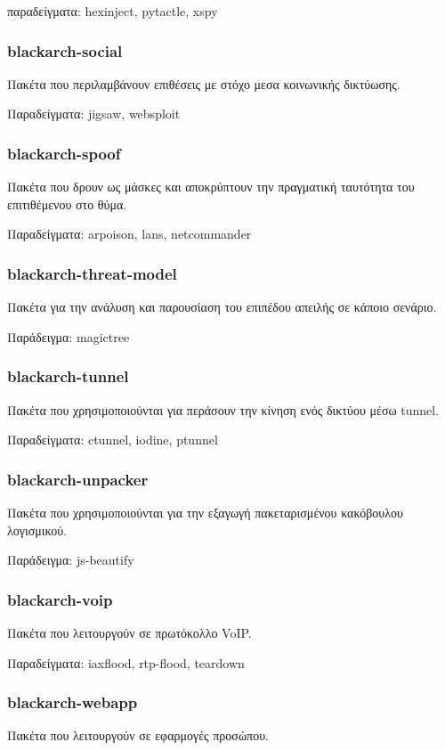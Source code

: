 \documentclass[a4paper, oneside, 11pt]{book}
\begin{document}
παραδείγματα: hexinject, pytactle, xspy

\subsubsection{blackarch-social}
Πακέτα που περιλαμβάνουν επιθέσεις με στόχο
μεσα κοινωνικής δικτύωσης.

Παραδείγματα: jigsaw, websploit

\subsubsection{blackarch-spoof}
Πακέτα που δρουν ως μάσκες και αποκρύπτουν την
πραγματική ταυτότητα του επιτιθέμενου στο θύμα.

Παραδείγματα: arpoison, lans, netcommander

\subsubsection{blackarch-threat-model}
Πακέτα για την ανάλυση και παρουσίαση του επιπέδου
απειλής σε κάποιο σενάριο.

Παράδειγμα: magictree

\subsubsection{blackarch-tunnel}
Πακέτα που χρησιμοποιούνται για περάσουν την κίνηση
ενός δικτύου μέσω tunnel.

Παραδείγματα: ctunnel, iodine, ptunnel

\subsubsection{blackarch-unpacker}
Πακέτα που χρησιμοποιούνται για την εξαγωγή 
πακεταρισμένου κακόβουλου λογισμικού.

Παράδειγμα: js-beautify

\subsubsection{blackarch-voip}
Πακέτα που λειτουργούν σε πρωτόκολλο VoIP.

Παραδείγματα: iaxflood, rtp-flood, teardown

\subsubsection{blackarch-webapp}
Πακέτα που λειτουργούν σε εφαρμογές προσώπου.
\end{document}
